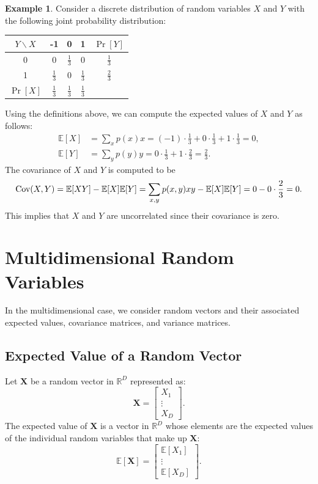\documentclass[12pt,openany]{book}
\theoremstyle{definition}
\newtheorem{example}{Example}[chapter]
\newcommand{\E}{\mathbb{E}}
\newcommand{\Cov}{\textnormal{Cov}}
\renewcommand{\vec}[1]{\textbf{#1}}
\begin{document}
	\begin{example}
		Consider a discrete distribution of random variables \( X \) and \( Y \) with the following joint probability distribution:
		
		\begin{center}
			\begin{tabular}{c|ccc|c}
				\( Y \backslash X \) & -1 & 0 & 1 & \( \Pr[Y] \) \\
				\hline
				0 & 0 & \( \frac{1}{3} \) & 0 & \( \frac{1}{3} \) \\
				1 & \( \frac{1}{3} \) & 0 & \( \frac{1}{3} \) & \( \frac{2}{3} \) \\
				\hline
				\( \Pr[X] \) & \( \frac{1}{3} \) & \( \frac{1}{3} \) & \( \frac{1}{3} \) & \\
			\end{tabular}
		\end{center}
		
		Using the definitions above, we can compute the expected values of \( X \) and \( Y \) as follows:
		\[
		\begin{aligned}
			\E[X] &= \sum_x p(x)x = (-1) \cdot \frac{1}{3} + 0 \cdot \frac{1}{3} + 1 \cdot \frac{1}{3} = 0, \\
			\E[Y] &= \sum_y p(y)y = 0 \cdot \frac{1}{3} + 1 \cdot \frac{2}{3} = \frac{2}{3}.
		\end{aligned}
		\]
		The covariance of \( X \) and \( Y \) is computed to be
		\[
		\Cov(X, Y) = \E[XY] - \E[X]\E[Y] = \sum_{x,y} p(x, y)xy - \E[X]\E[Y] = 0 - 0 \cdot \frac{2}{3} = 0.
		\]
		This implies that \( X \) and \( Y \) are uncorrelated since their covariance is zero.
	\end{example}
	
	\section{Multidimensional Random Variables}
	
	In the multidimensional case, we consider random vectors and their associated expected values, covariance matrices, and variance matrices.
	
	\subsection{Expected Value of a Random Vector}
	Let \( \vec{X} \) be a random vector in \( \mathbb{R}^D \) represented as:
	\[
	\vec{X} = \begin{bmatrix}
		X_1 \\
		\vdots \\
		X_D
	\end{bmatrix}.
	\]
	The expected value of \( \vec{X} \) is a vector in \( \mathbb{R}^D \) whose elements are the expected values of the individual random variables that make up \( \vec{X} \):
	\[
	\E[\vec{X}] = \begin{bmatrix}
		\E[X_1] \\
		\vdots \\
		\E[X_D]
	\end{bmatrix}.
	\]
	
\end{document}
